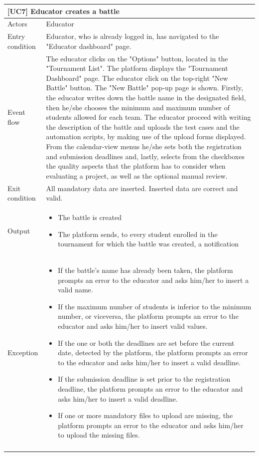 \documentclass[12pt,oneside,a4paper]{article}
\begin{document}
\clearpage

\begin{table}[htbp]
\begin{tabular}{|l|p{12cm}|}
    \hline
    \multicolumn{2}{|l|}{\textbf{[UC7] Educator creates a battle}}\\
    \hline
    Actors & Educator\\
    \hline
    Entry condition & Educator, who is already logged in, has navigated to the "Educator dashboard" page.\\
    \hline
    Event flow & The educator clicks on the "Options" button, located in the "Tournament List". The platform displays the "Tournament Dashboard" page. The educator click on the top-right "New Battle" button. The "New Battle" pop-up page is shown. Firstly, the educator writes down the battle name in the designated field, then he/she chooses the minimum and maximum number of students allowed for each team. The educator proceed with writing the description of the battle and uploads the test cases and the automation scripts, by making use of the upload forms displayed. From the calendar-view menus he/she sets both the registration and submission deadlines and, lastly, selects from the checkboxes the quality aspects that the platform has to consider when evaluating a project, as well as the optional manual review.\\
    \hline
    Exit condition & All mandatory data are inserted. Inserted data are correct and valid.\\
    \hline
    Output & \begin{itemize}
        \item The battle is created
        \item The platform sends, to every student enrolled in the tournament for which the battle was created, a notification
    \end{itemize}\\
    \hline
    Exception & \begin{itemize}
        \item If the battle's name has already been taken, the platform prompts an error to the educator and asks him/her to insert a valid name.
        \item If the maximum number of students is inferior to the minimum number, or viceversa, the platform prompts an error to the educator and asks him/her to insert valid values.
        \item If the one or both the deadlines are set before the current date, detected by the platform, the platform prompts an error to the educator and asks him/her to insert a valid deadline.
        \item If the submission deadline is set prior to the registration deadline, the platform prompts an error to the educator and asks him/her to insert a valid deadline.
        \item If one or more mandatory files to upload are missing, the platform prompts an error to the educator and asks him/her to upload the missing files.
    \end{itemize}\\
    \lasthline
\end{tabular}
\end{table}
\end{document}
